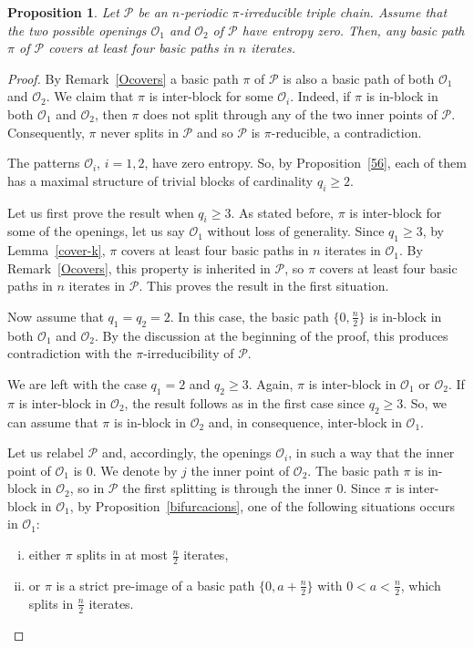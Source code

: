 \documentclass[a4paper]{amsart}
\newtheorem{proposition}[theorem]{Proposition}
\theoremstyle{definition}
\begin{document}
\begin{proposition}\label{cover4}
Let $\mathcal{P}$ be an $n$-periodic $\pi$-irreducible triple chain. Assume that the two possible openings $\mathcal{O}_{1}$ and $\mathcal{O}_{2}$ of $\mathcal{P}$ have entropy zero.
Then, any basic path $\pi$ of $\mathcal{P}$ covers at least four basic paths in $n$ iterates.
\end{proposition}
\begin{proof}
By Remark~\ref{Ocovers} a basic path $\pi$ of $\mathcal{P}$ is also a basic path of both $\mathcal{O}_1$ and $\mathcal{O}_2$. We claim that $\pi$ is inter-block for some $\mathcal{O}_i$. Indeed, if $\pi$ is in-block in both $\mathcal{O}_1$ and $\mathcal{O}_2$, then $\pi$ does not split through any of the two inner points of $\mathcal{P}$. Consequently, $\pi$ never splits in $\mathcal{P}$ and so $\mathcal{P}$ is $\pi$-reducible, a contradiction.

The patterns $\mathcal{O}_i$, $i=1,2$, have zero entropy. So, by Proposition~\ref{56}, each of them has a maximal structure of trivial blocks of cardinality $q_i\geq 2$.

Let us first prove the result when $q_i\geq 3$. As stated before, $\pi$ is inter-block for some of the openings, let us say $\mathcal{O}_1$ without loss of generality. Since $q_1\geq 3$, by Lemma~\ref{cover-k}, $\pi$ covers at least four basic paths in $n$ iterates in $\mathcal{O}_1$. By Remark~\ref{Ocovers}, this property is inherited in $\mathcal{P}$, so $\pi$ covers at least four basic paths in $n$ iterates in $\mathcal{P}$. This proves the result in the first situation.

Now assume that $q_1=q_2=2$. In this case, the basic path $\{0,\frac{n}{2}\}$ is in-block in both $\mathcal{O}_1$ and $\mathcal{O}_2$. By the discussion at the beginning of the proof, this produces contradiction with the $\pi$-irreducibility of $\mathcal{P}$.

We are left with the case $q_1=2$ and $q_2\geq 3$. Again, $\pi$ is inter-block in $\mathcal{O}_1$ or $\mathcal{O}_2$. If $\pi$ is inter-block in $\mathcal{O}_2$, the result follows as in the first case since $q_2\geq 3$. So, we can assume that $\pi$ is in-block in $\mathcal{O}_2$ and, in consequence, inter-block in $\mathcal{O}_1$.

Let us relabel $\mathcal{P}$ and, accordingly, the openings $\mathcal{O}_i$, in such a way that the inner point of $\mathcal{O}_1$ is $0$. We denote by $j$ the inner point of $\mathcal{O}_2$. The basic path $\pi$ is in-block in $\mathcal{O}_2$, so in $\mathcal{P}$ the first splitting is through the inner $0$.
Since $\pi$ is inter-block in $\mathcal{O}_1$, by Proposition~\ref{bifurcacions}, one of the following situations occurs in $\mathcal{O}_1$:
\begin{enumerate}[(i)]
	\item either $\pi$ splits in at most $\frac{n}{2}$ iterates,
	\item or $\pi$ is a strict pre-image of a basic path $\{0,a+\frac{n}{2}\}$ with $0<a<\frac{n}{2}$, which splits in $\frac{n}{2}$ iterates.
\end{enumerate}


\end{proof}
\end{document}
